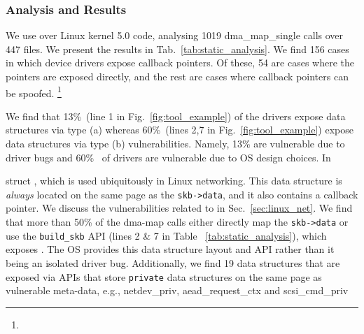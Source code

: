 \DIFaddend \subsubsection{Analysis and Results}
We use \tool over Linux kernel 5.0 code,
analysing 1019 dma\_map\_single calls over 447 files. We present the results in Tab.~\ref{tab:static_analysis}. 
We find 156 cases in which device drivers expose callback pointers. Of these, 54 are cases where the pointers are exposed directly, and the rest are cases where callback pointers can be spoofed.
\DIFdelbegin \footnote{}
\addtocounter{footnote}{-1}%
\DIFdelend We find that 13\%~(line 1 in Fig.~\ref{fig:tool_example}) of the drivers expose data structures via type (a) \DIFdelbegin {}\DIFdelend \DIFaddbegin {}\DIFaddend whereas 60\%~(lines 2,7 in Fig.~\ref{fig:tool_example}) expose data structures via type (b) vulnerabilities. Namely, 13\% are vulnerable due to driver bugs and 60\%~ of drivers are vulnerable due to OS design choices. In \DIFdelbegin {}%

\DIFdelend \DIFaddbegin {}\DIFaddend struct \shinfo, which is used ubiquitously in Linux networking. This data structure is \textit{always} located on the same page as the \texttt{skb->data}, and it also contains a callback pointer. We discuss the vulnerabilities related to \shinfo in Sec.~\ref{sec:linux_net}. We find that more than 50\% of the dma-map calls either directly map the \texttt{skb->data} or use the \texttt{build\_skb} API (lines 2 \& 7 in Table ~\ref{tab:static_analysis}), which exposes \shinfo. The OS provides this data structure layout and API rather than it being an isolated driver bug. Additionally, we find 19 data structures that are exposed via APIs that store \texttt{private} data structures on the same page as vulnerable meta-data, e.g., netdev\_priv, aead\_request\_ctx and scsi\_cmd\_priv\DIFaddbegin {}

